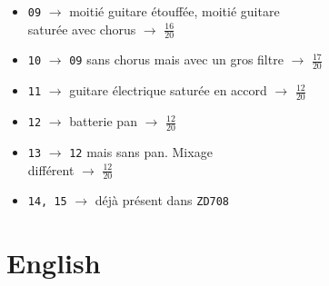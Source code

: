 \documentclass[a4paper, 13pt]{article}
\begin{document}
\begin{itemize}
    \item \texttt{09} $\rightarrow$ moitié guitare étouffée, moitié guitare \\ saturée avec chorus $\rightarrow$ \Large{$\frac{16}{20}$} \normalsize \vspace{0.2cm}
    \item \texttt{10} $\rightarrow$ \texttt{09} sans chorus mais avec un gros filtre $\rightarrow$ \Large{$\frac{17}{20}$} \normalsize \vspace{0.2cm}
    \item \texttt{11} $\rightarrow$ guitare électrique saturée en accord $\rightarrow$ \Large{$\frac{12}{20}$} \normalsize \vspace{0.2cm}
    \item \texttt{12} $\rightarrow$ batterie pan $\rightarrow$ \Large{$\frac{12}{20}$} \normalsize \vspace{0.2cm}
    \item \texttt{13} $\rightarrow$ \texttt{12} mais sans pan. Mixage \\ différent $\rightarrow$ \Large{$\frac{12}{20}$} \normalsize \vspace{0.2cm}
    \item \texttt{14, 15} $\rightarrow$ déjà présent dans \texttt{ZD708}
\end{itemize}

\vspace{1cm}
\section*{English}
\end{document}
